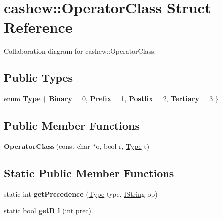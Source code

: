 \hypertarget{structcashew_1_1_operator_class}{}\section{cashew\+:\+:Operator\+Class Struct Reference}
\label{structcashew_1_1_operator_class}


Collaboration diagram for cashew\+:\+:Operator\+Class\+:
\subsection*{Public Types}
\begin{DoxyCompactItemize}
\item 
\mbox{\label{structcashew_1_1_operator_class_aca043324349d98fa01f0f78903bb54ac}} 
enum {\bfseries Type} \{ {\bfseries Binary} = 0, 
{\bfseries Prefix} = 1, 
{\bfseries Postfix} = 2, 
{\bfseries Tertiary} = 3
 \}
\end{DoxyCompactItemize}
\subsection*{Public Member Functions}
\begin{DoxyCompactItemize}
\item 
\mbox{\label{structcashew_1_1_operator_class_ac71142ec0e7aa40044068f93357fa844}} 
{\bfseries Operator\+Class} (const char $\ast$o, bool r, \mbox{\hyperlink{struct_type}{Type}} t)
\end{DoxyCompactItemize}
\subsection*{Static Public Member Functions}
\begin{DoxyCompactItemize}
\item 
\mbox{\label{structcashew_1_1_operator_class_a565b133cfa413b39be572944cf77ed1b}} 
static int {\bfseries get\+Precedence} (\mbox{\hyperlink{struct_type}{Type}} type, \mbox{\hyperlink{structcashew_1_1_i_string}{I\+String}} op)
\item 
\mbox{\label{structcashew_1_1_operator_class_a88aec53d81072e2e2b8a4e5b777884fc}} 
static bool {\bfseries get\+Rtl} (int prec)
\end{DoxyCompactItemize}
